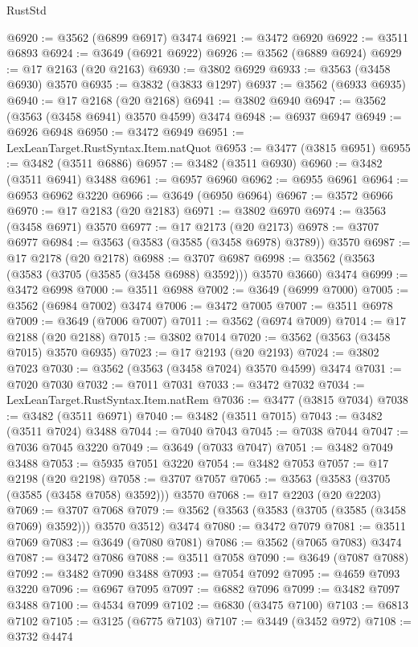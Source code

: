 \begin{lexlean}{RustStd}
\begin{coremodule}
@6920 := @3562 (@6899 @6917) @3474
@6921 := @3472 @6920
@6922 := @3511 @6893
@6924 := @3649 (@6921 @6922)
@6926 := @3562 (@6889 @6924)
@6929 := @17 @2163 (@20 @2163)
@6930 := @3802 @6929
@6933 := @3563 (@3458 @6930) @3570
@6935 := @3832 (@3833 @1297)
@6937 := @3562 (@6933 @6935)
@6940 := @17 @2168 (@20 @2168)
@6941 := @3802 @6940
@6947 := @3562 (@3563 (@3458 @6941) @3570 @4599) @3474
@6948 := @6937 @6947
@6949 := @6926 @6948
@6950 := @3472 @6949
@6951 := LexLeanTarget.RustSyntax.Item.natQuot
@6953 := @3477 (@3815 @6951)
@6955 := @3482 (@3511 @6886)
@6957 := @3482 (@3511 @6930)
@6960 := @3482 (@3511 @6941) @3488
@6961 := @6957 @6960
@6962 := @6955 @6961
@6964 := @6953 @6962 @3220
@6966 := @3649 (@6950 @6964)
@6967 := @3572 @6966
@6970 := @17 @2183 (@20 @2183)
@6971 := @3802 @6970
@6974 := @3563 (@3458 @6971) @3570
@6977 := @17 @2173 (@20 @2173)
@6978 := @3707 @6977
@6984 := @3563 (@3583 (@3585 (@3458 @6978) @3789)) @3570
@6987 := @17 @2178 (@20 @2178)
@6988 := @3707 @6987
@6998 := @3562 (@3563 (@3583 (@3705 (@3585 (@3458 @6988) @3592))) @3570 @3660) @3474
@6999 := @3472 @6998
@7000 := @3511 @6988
@7002 := @3649 (@6999 @7000)
@7005 := @3562 (@6984 @7002) @3474
@7006 := @3472 @7005
@7007 := @3511 @6978
@7009 := @3649 (@7006 @7007)
@7011 := @3562 (@6974 @7009)
@7014 := @17 @2188 (@20 @2188)
@7015 := @3802 @7014
@7020 := @3562 (@3563 (@3458 @7015) @3570 @6935)
@7023 := @17 @2193 (@20 @2193)
@7024 := @3802 @7023
@7030 := @3562 (@3563 (@3458 @7024) @3570 @4599) @3474
@7031 := @7020 @7030
@7032 := @7011 @7031
@7033 := @3472 @7032
@7034 := LexLeanTarget.RustSyntax.Item.natRem
@7036 := @3477 (@3815 @7034)
@7038 := @3482 (@3511 @6971)
@7040 := @3482 (@3511 @7015)
@7043 := @3482 (@3511 @7024) @3488
@7044 := @7040 @7043
@7045 := @7038 @7044
@7047 := @7036 @7045 @3220
@7049 := @3649 (@7033 @7047)
@7051 := @3482 @7049 @3488
@7053 := @5935 @7051 @3220
@7054 := @3482 @7053
@7057 := @17 @2198 (@20 @2198)
@7058 := @3707 @7057
@7065 := @3563 (@3583 (@3705 (@3585 (@3458 @7058) @3592))) @3570
@7068 := @17 @2203 (@20 @2203)
@7069 := @3707 @7068
@7079 := @3562 (@3563 (@3583 (@3705 (@3585 (@3458 @7069) @3592))) @3570 @3512) @3474
@7080 := @3472 @7079
@7081 := @3511 @7069
@7083 := @3649 (@7080 @7081)
@7086 := @3562 (@7065 @7083) @3474
@7087 := @3472 @7086
@7088 := @3511 @7058
@7090 := @3649 (@7087 @7088)
@7092 := @3482 @7090 @3488
@7093 := @7054 @7092
@7095 := @4659 @7093 @3220
@7096 := @6967 @7095
@7097 := @6882 @7096
@7099 := @3482 @7097 @3488
@7100 := @4534 @7099
@7102 := @6830 (@3475 @7100)
@7103 := @6813 @7102
@7105 := @3125 (@6775 @7103)
@7107 := @3449 (@3452 @972)
@7108 := @3732 @4474

\end{coremodule}
\end{lexlean}
